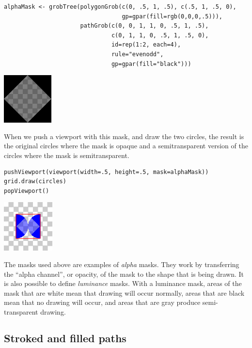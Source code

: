 \begin{verbatim}
alphaMask <- grobTree(polygonGrob(c(0, .5, 1, .5), c(.5, 1, .5, 0),
                                  gp=gpar(fill=rgb(0,0,0,.5))),
                      pathGrob(c(0, 0, 1, 1, 0, .5, 1, .5),
                               c(0, 1, 1, 0, .5, 1, .5, 0),
                               id=rep(1:2, each=4),
                               rule="evenodd",
                               gp=gpar(fill="black")))
\end{verbatim}

\includegraphics{murrell-definitions-2023_files/figure-latex/unnamed-chunk-21-1.png}

When we push a viewport with this mask, and draw the two circles,
the result is the original circles where the mask is opaque
and a semitransparent version of the circles where the mask is
semitransparent.

\begin{verbatim}
pushViewport(viewport(width=.5, height=.5, mask=alphaMask))
grid.draw(circles)
popViewport()
\end{verbatim}

\includegraphics{murrell-definitions-2023_files/figure-latex/unnamed-chunk-22-1.png}

The masks used above are examples of \emph{alpha} masks. They work by
transferring the ``alpha channel'', or opacity, of the mask to the
shape that is being drawn.
It is also possible to define \emph{luminance} masks.
With a luminance mask, areas of the mask that are white mean that
drawing will occur normally, areas that are black mean that
no drawing will occur, and areas that are gray produce semi-transparent
drawing.

\hypertarget{stroked-and-filled-paths}{%
\subsection{Stroked and filled paths}\label{stroked-and-filled-paths}}

